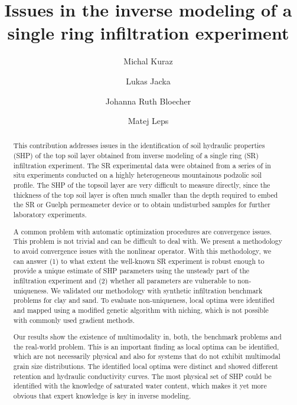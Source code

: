 \documentclass[review,times,3p,twocolumn,10pt]{elsarticle}
\begin{document}
\begin{frontmatter}

\title{Issues in the inverse modeling of a single ring infiltration experiment}

\author[autor1]{Michal Kuraz}

\author[autor1]{Lukas Jacka}

\author[autor1]{Johanna Ruth Bloecher}

\author[autor2]{Matej Leps}



\address[autor1]{Czech University of Life Sciences Prague, Faculty of Environmental Sciences, Department of Water Resources and Environmental Modeling}

\address[autor2]{Czech Technical University in Prague, Faculty of Civil Engineering, Department of Mechanics}

\begin{abstract}
This contribution addresses issues in the identification of soil hydraulic properties (SHP) of the top soil layer obtained from inverse modeling of a single ring (SR) infiltration experiment. 
The SR experimental data were obtained from a series of in situ experiments conducted on a highly heterogeneous mountainous podzolic soil profile. The SHP of the topsoil layer are very difficult to measure directly, since the thickness of the top soil layer is often much smaller than the depth required to embed the SR or Guelph permeameter device or to obtain undisturbed samples for further laboratory experiments.

A common problem with automatic optimization procedures are convergence issues. This problem is not trivial and can be difficult to deal with. We present a methodology to avoid convergence issues with the nonlinear operator. With this methodology, we can answer (1) to what extent the well-known SR experiment is robust enough to provide a unique estimate of SHP parameters using the unsteady part of the infiltration experiment and (2) whether all parameters are vulnerable to non-uniqueness. We validated our methodology with synthetic infiltration benchmark problems for clay and sand. To evaluate non-uniqueness, local optima were identified and mapped using a modified genetic algorithm with niching, which is not possible with commonly used gradient methods. 

Our results show the existence of multimodality in, both, the benchmark problems and the real-world problem. This is an important finding as local optima can be identified, which are not necessarily physical and also for systems that do not exhibit multimodal grain size distributions. The identified local optima were distinct and showed different retention and hydraulic conductivity curves. The most physical set of SHP could be identified with the knowledge of saturated water content, which makes it yet more obvious that expert knowledge is key in inverse modeling.   



\end{abstract}
\end{frontmatter}
\end{document}
